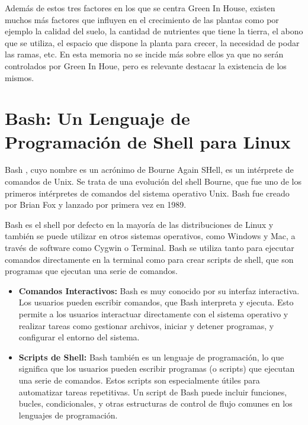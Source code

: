 Además de estos tres factores en los que se centra Green In House, existen muchos más factores que influyen en el crecimiento de las plantas como por ejemplo la calidad del suelo, la cantidad de nutrientes que tiene la tierra, el abono que se utiliza, el espacio que dispone la planta para crecer, la necesidad de podar las ramas, etc. En esta memoria no se incide más sobre ellos ya que no serán controlados por Green In Houe, pero es relevante destacar la existencia de los mismos.


\section{Bash: Un Lenguaje de Programación de Shell para Linux}

Bash \citep{wiki:bash}, cuyo nombre es un acrónimo de Bourne Again SHell, es un intérprete de comandos de Unix. Se trata de una evolución del shell Bourne, que fue uno de los primeros intérpretes de comandos del sistema operativo Unix. Bash fue creado por Brian Fox y lanzado por primera vez en 1989. 

Bash es el shell por defecto en la mayoría de las distribuciones de Linux y también se puede utilizar en otros sistemas operativos, como Windows y Mac, a través de software como Cygwin o Terminal. Bash se utiliza tanto para ejecutar comandos directamente en la terminal como para crear scripts de shell, que son programas que ejecutan una serie de comandos.

\begin{itemize}

    \item \textbf{Comandos Interactivos:} Bash es muy conocido por su interfaz interactiva. Los usuarios pueden escribir comandos, que Bash interpreta y ejecuta. Esto permite a los usuarios interactuar directamente con el sistema operativo y realizar tareas como gestionar archivos, iniciar y detener programas, y configurar el entorno del sistema.
    
    \item \textbf{Scripts de Shell:} Bash también es un lenguaje de programación, lo que significa que los usuarios pueden escribir programas (o scripts) que ejecutan una serie de comandos. Estos scripts son especialmente útiles para automatizar tareas repetitivas. Un script de Bash puede incluir funciones, bucles, condicionales, y otras estructuras de control de flujo comunes en los lenguajes de programación.
    
\end{itemize}

